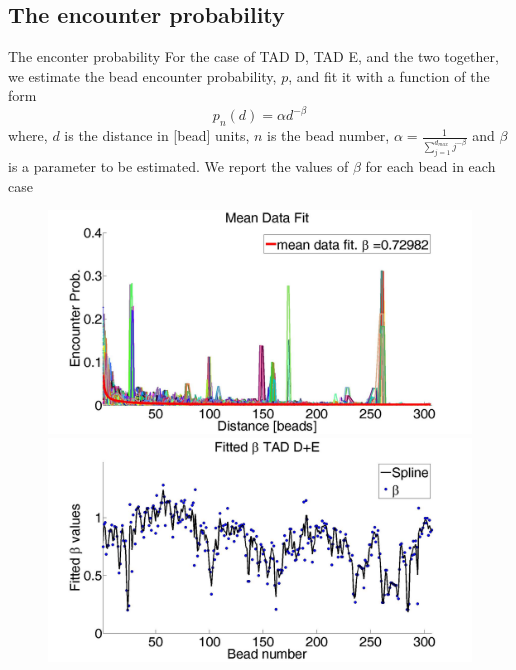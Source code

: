 \documentclass[8pt]{beamer}
\begin{document}
\subsection{The encounter probability}\label{subsection_theEncounterProbability}
\begin{frame}{The enconter probability}
For the case of TAD D, TAD E, and the two together, we estimate the bead encounter probability, $p$, and fit it with a function of the form 
\begin{equation*}
p_n(d)=\alpha d^{-\beta}
\end{equation*}
where, $d$ is the distance in [bead] units, $n$ is the bead number, $\alpha=\frac{1}{\sum_{j=1}^{d_{max}}j^{-\beta}}$ and $\beta$ is a parameter to be estimated.
We report the values of $\beta$ for each bead in each case
\begin{figure}[H]
\includegraphics[scale=0.1]{meanDataFitTADDAndE}
\includegraphics[scale=0.1]{fittedExpValuesWithSplineAverageTADDAndE}
\end{figure}
\end{frame}
\end{document}
